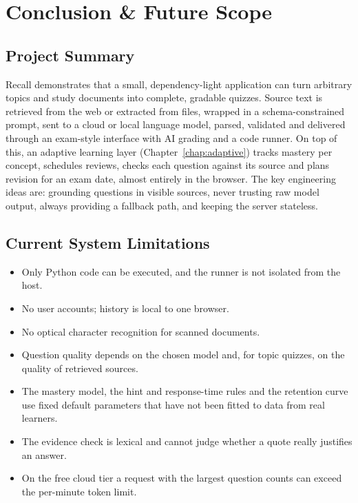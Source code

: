 \chapter{Conclusion \& Future Scope}

\section{Project Summary}
Recall demonstrates that a small, dependency-light application can turn arbitrary topics and study documents into complete, gradable quizzes. Source text is retrieved from the web or extracted from files, wrapped in a schema-constrained prompt, sent to a cloud or local language model, parsed, validated and delivered through an exam-style interface with AI grading and a code runner. On top of this, an adaptive learning layer (Chapter~\ref{chap:adaptive}) tracks mastery per concept, schedules reviews, checks each question against its source and plans revision for an exam date, almost entirely in the browser. The key engineering ideas are: grounding questions in visible sources, never trusting raw model output, always providing a fallback path, and keeping the server stateless.

\section{Current System Limitations}
\begin{itemize}
\item Only Python code can be executed, and the runner is not isolated from the host.
\item No user accounts; history is local to one browser.
\item No optical character recognition for scanned documents.
\item Question quality depends on the chosen model and, for topic quizzes, on the quality of retrieved sources.
\item The mastery model, the hint and response-time rules and the retention curve use fixed default parameters that have not been fitted to data from real learners.
\item The evidence check is lexical and cannot judge whether a quote really justifies an answer.
\item On the free cloud tier a request with the largest question counts can exceed the per-minute token limit.
\end{itemize}

